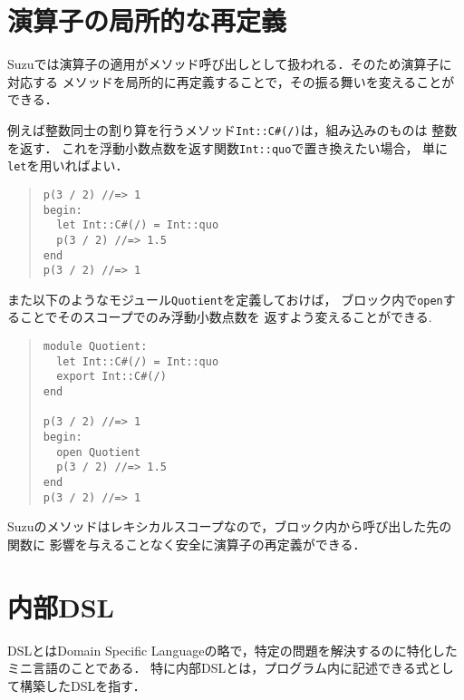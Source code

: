 \documentclass[a4paper,11pt,dvipdfmx]{jreport}
\begin{document}
\section{演算子の局所的な再定義}
\label{section:operator}

Suzuでは演算子の適用がメソッド呼び出しとして扱われる．そのため演算子に対応する
メソッドを局所的に再定義することで，その振る舞いを変えることができる．

例えば整数同士の割り算を行うメソッド\verb|Int::C#(/)|は，組み込みのものは
整数を返す．
これを浮動小数点数を返す関数\verb|Int::quo|で置き換えたい場合，
単に\verb|let|を用いればよい．
\begin{quote}
\begin{verbatim}
p(3 / 2) //=> 1
begin:
  let Int::C#(/) = Int::quo
  p(3 / 2) //=> 1.5
end
p(3 / 2) //=> 1
\end{verbatim}
\end{quote}

また以下のようなモジュール\verb|Quotient|を定義しておけば，
ブロック内で\verb|open|することでそのスコープでのみ浮動小数点数を
返すよう変えることができる.
\begin{quote}
\begin{verbatim}
module Quotient:
  let Int::C#(/) = Int::quo
  export Int::C#(/)
end

p(3 / 2) //=> 1
begin:
  open Quotient
  p(3 / 2) //=> 1.5
end
p(3 / 2) //=> 1
\end{verbatim}
\end{quote}

Suzuのメソッドはレキシカルスコープなので，ブロック内から呼び出した先の関数に
影響を与えることなく安全に演算子の再定義ができる．


\section{内部DSL}
\label{section:dsl}

DSLとはDomain Specific Languageの略で，特定の問題を解決するのに特化した
ミニ言語のことである．
特に内部DSLとは，プログラム内に記述できる式として構築したDSLを指す．
\end{document}

